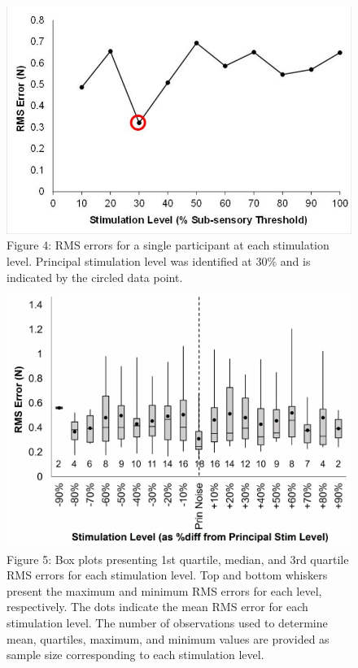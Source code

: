 \documentclass[]{cik}%
\begin{document}
\begin{figure}

{\centering \includegraphics[width=1\textwidth,height=\textheight]{./figures/fig4.pdf}

}

\caption{\label{fig-4}Figure 4: RMS errors for a single participant at
each stimulation level. Principal stimulation level was identified at
30\% and is indicated by the circled data point.}

\end{figure}

\begin{figure}

{\centering \includegraphics[width=1\textwidth,height=\textheight]{./figures/fig5.pdf}

}

\caption{\label{fig-5}Figure 5: Box plots presenting 1st quartile,
median, and 3rd quartile RMS errors for each stimulation level. Top and
bottom whiskers present the maximum and minimum RMS errors for each
level, respectively. The dots indicate the mean RMS error for each
stimulation level. The number of observations used to determine mean,
quartiles, maximum, and minimum values are provided as sample size
corresponding to each stimulation level.}

\end{figure}
\end{document}
